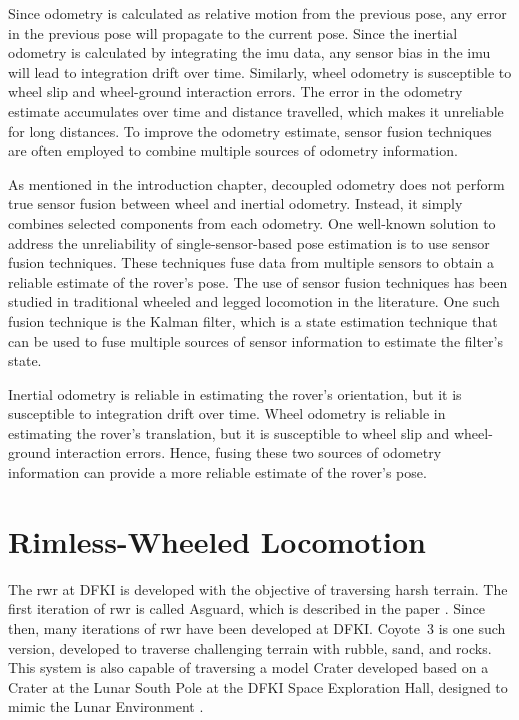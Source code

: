 \documentclass[report.tex]{subfiles}
\begin{document}
    Since odometry is calculated as relative motion from the previous pose, any error in the previous pose will propagate to the current pose. Since the inertial odometry is calculated by integrating the \gls{imu} data, any sensor bias in the \gls{imu} will lead to integration drift over time. Similarly, wheel odometry is susceptible to wheel slip and wheel-ground interaction errors. The error in the odometry estimate accumulates over time and distance travelled, which makes it unreliable for long distances. To improve the odometry estimate, sensor fusion techniques are often employed to combine multiple sources of odometry information.

    As mentioned in the introduction chapter, decoupled odometry does not perform true sensor fusion between wheel and inertial odometry. Instead, it simply combines selected components from each odometry. One well-known solution to address the unreliability of single-sensor-based pose estimation is to use sensor fusion techniques. These techniques fuse data from multiple sensors to obtain a reliable estimate of the rover's pose. The use of sensor fusion techniques has been studied in traditional wheeled \cite{Brossard2019, Das2021, Liu2020, Xiaobo2024} and legged \cite{DeLen2020} locomotion in the literature. One such fusion technique is the Kalman filter, which is a state estimation technique that can be used to fuse multiple sources of sensor information to estimate the filter's state. 

    Inertial odometry is reliable in estimating the rover's orientation, but it is susceptible to integration drift over time. Wheel odometry is reliable in estimating the rover's translation, but it is susceptible to wheel slip and wheel-ground interaction errors. Hence, fusing these two sources of odometry information can provide a more reliable estimate of the rover's pose. 

\section{Rimless-Wheeled Locomotion}
\label{sec:background_rimless_wheeled_locomotion}

    The \gls{rwr} at DFKI is developed with the objective of traversing harsh terrain. The first iteration of \gls{rwr} is called Asguard, which is described in the paper \cite{Eich2008AsguardFirstPaper}. Since then, many iterations of \gls{rwr} have been developed at DFKI. Coyote~3 is one such version, developed to traverse challenging terrain with rubble, sand, and rocks. This system is also capable of traversing a model Crater developed based on a Crater at the Lunar South Pole at the DFKI Space Exploration Hall, designed to mimic the Lunar Environment \cite{SITE-dfki-relab}. 
    
\end{document}
